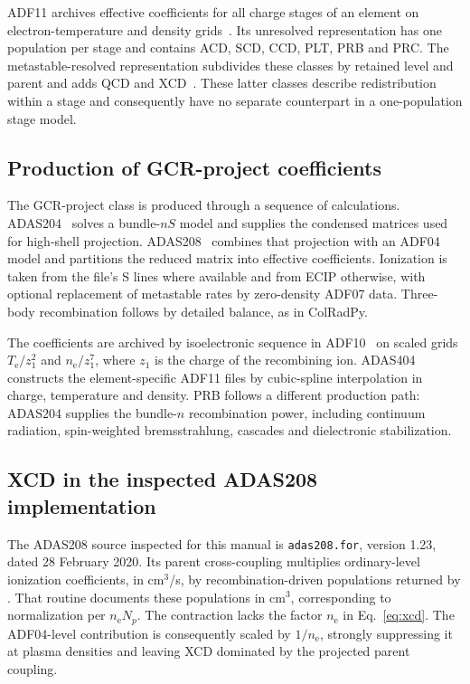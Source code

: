 \documentclass[11pt,a4paper]{article}
\newcommand{\code}[1]{\texttt{\detokenize{#1}}}
\newcommand{\routine}[1]{\textsf{\detokenize{#1}}}
\newcommand{\nelec}{n_{\mathrm e}}
\newcommand{\Te}{T_{\mathrm e}}
\numberwithin{equation}{section}
\begin{document}
ADF11 archives effective coefficients for all charge stages of an
element on electron-temperature and density grids~\cite{adf11}.
Its unresolved representation has one population per stage and
contains ACD, SCD, CCD, PLT, PRB and PRC. The metastable-resolved
representation subdivides these classes by retained level and
parent and adds QCD and XCD~\cite{summers2006}. These latter
classes describe redistribution within a stage and consequently
have no separate counterpart in a one-population stage model.

\subsection{Production of GCR-project coefficients}

The GCR-project class \code{96} is produced through a sequence of
calculations. ADAS204~\cite{adas204} solves a bundle-$nS$ model
and supplies the condensed matrices used for high-shell projection.
ADAS208~\cite{adas208} combines that projection with an ADF04
model and partitions the reduced matrix into effective coefficients.
Ionization is taken from the file's S lines where available and
from ECIP otherwise, with optional replacement of metastable rates
by zero-density ADF07 data. Three-body recombination follows by
detailed balance, as in ColRadPy.

The coefficients are archived by isoelectronic sequence in
ADF10~\cite{adf10} on scaled grids $\Te/z_1^2$ and
$\nelec/z_1^7$, where $z_1$ is the charge of the recombining ion.
ADAS404~\cite{adas404} constructs the element-specific ADF11 files
by cubic-spline interpolation in charge, temperature and density.
PRB follows a different production path: ADAS204 supplies the
bundle-$n$ recombination power, including continuum radiation,
spin-weighted bremsstrahlung, cascades and dielectronic stabilization.

\subsection{XCD in the inspected ADAS208 implementation}

The ADAS208 source inspected for this manual is
\texttt{adas208.for}, version 1.23, dated 28 February 2020.
Its parent cross-coupling multiplies ordinary-level ionization
coefficients, in cm$^3$/s, by recombination-driven populations
returned by \routine{B8STKE}. That routine documents these
populations in cm$^3$, corresponding to normalization per
$\nelec N_p$. The contraction lacks the factor $\nelec$ in
Eq.~\eqref{eq:xcd}. The ADF04-level contribution is consequently
scaled by $1/\nelec$, strongly suppressing it at plasma densities and leaving XCD
dominated by the projected parent coupling.
\end{document}

